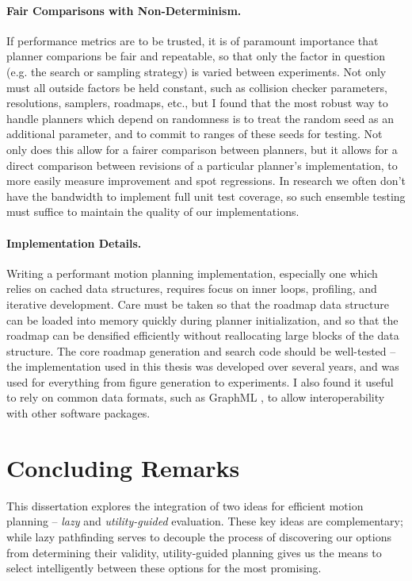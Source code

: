 \paragraph{Fair Comparisons with Non-Determinism.}
If performance metrics are to be trusted,
it is of paramount importance that planner comparions be fair
and repeatable,
so that only the factor in question
(e.g. the search or sampling strategy) is varied between experiments.
Not only must all outside factors be held constant,
such as collision checker parameters, resolutions, samplers, roadmaps, etc.,
but I found that the most robust way to handle planners which depend
on randomness is to treat the random seed as an additional parameter,
and to commit to ranges of these seeds for testing.
Not only does this allow for a fairer comparison between planners,
but it allows for a direct comparison between revisions of a particular
planner's implementation,
to more easily measure improvement and spot regressions.
In research we often don't have the bandwidth to implement full
unit test coverage, so such ensemble testing must suffice to maintain
the quality of our implementations.

\paragraph{Implementation Details.}
Writing a performant motion planning implementation,
especially one which relies on cached data structures,
requires focus on inner loops, profiling, and iterative development.
Care must be taken so that the roadmap data structure can be loaded
into memory quickly during planner initialization,
and so that the roadmap can be densified efficiently without
reallocating large blocks of the data structure.
The core roadmap generation and search code should be well-tested --
the implementation used in this thesis was developed over several years,
and was used for everything from figure generation to experiments.
I also found it useful to rely on common data formats,
such as GraphML \citep{brandesetal2002graphml},
to allow interoperability with other software packages.

\section{Concluding Remarks}
\label{sec:conclusion:remarks}

This dissertation explores the integration of two ideas
for efficient motion planning
-- \emph{lazy} and \emph{utility-guided} evaluation.
These key ideas are complementary;
while lazy pathfinding serves to decouple the process of
discovering our options from determining their validity,
utility-guided planning gives us the means to select intelligently
between these options for the most promising.


